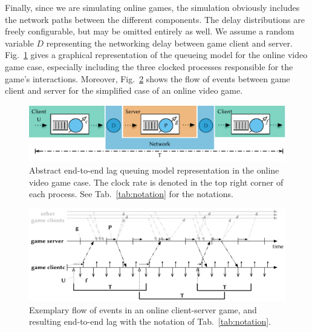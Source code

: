 Finally, since we are simulating online games, the simulation obviously 
includes the network paths between the different components. The delay 
distributions are freely configurable, but may be omitted entirely as well. We assume a random variable $D$ representing the networking delay between game client and server.
Fig.~\ref{fig:queuing-model} gives a graphical representation of the queueing model for the online video game case, especially including the three clocked processes responsible for the game's interactions.
Moreover, Fig.~\ref{fig:tickrate-timeseries} shows the flow of events between game client and server for the simplified case of an online video game.

\begin{figure}[!t]
	\centering
	\includegraphics[width=1.0\textwidth]{../models/e2e-lag-model.pdf}
	\caption{Abstract end-to-end lag queuing model representation in the online video game case. The clock rate is denoted in the top right corner of each process. See Tab.~\ref{tab:notation} for the notations.
	}
\label{fig:queuing-model}
\end{figure}


\begin{figure}[!t]
	\centering
	\includegraphics[width=1.0\columnwidth]{../models/tickrate-timeseries-notation.pdf}
	\caption{Exemplary flow of events in an online client-server game, and resulting end-to-end lag with the notation of Tab.~\ref{tab:notation}.
	} %
\label{fig:tickrate-timeseries}
\end{figure}



